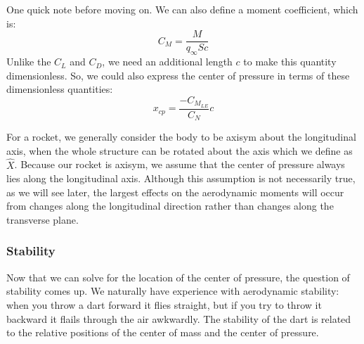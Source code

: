 \documentclass[10pt, openany, titlepage]{book}
\theoremstyle{definition}
\begin{document}
One quick note before moving on. We can also define a moment coefficient, which is:
$$C_M=\frac{M}{q_{\infty}Sc}$$
Unlike the $C_L$ and $C_D$, we need an additional length $c$ to make this quantity dimensionless. So, we could also express the center of pressure in terms of these dimensionless quantities:
$$x_{cp}=\frac{-C_{M_{LE}}}{C_N}c$$

For a rocket, we generally consider the body to be \gls{axisym} about the longitudinal axis, when the whole structure can be rotated about the axis which we define as $\hat{X}$.  Because our rocket is \gls{axisym}, we assume that the center of pressure always lies along the longitudinal axis. Although this assumption is not necessarily true, as we will see later, the largest effects on the aerodynamic moments will occur from changes along the longitudinal direction rather than changes along the transverse plane.

\subsubsection{Stability}

Now that we can solve for the location of the center of pressure, the question of stability comes up. We naturally have experience with aerodynamic stability: when you throw a dart forward it flies straight, but if you try to throw it backward it flails through the air awkwardly. The stability of the dart is related to the relative positions of the center of mass and the center of pressure. 
\end{document}
